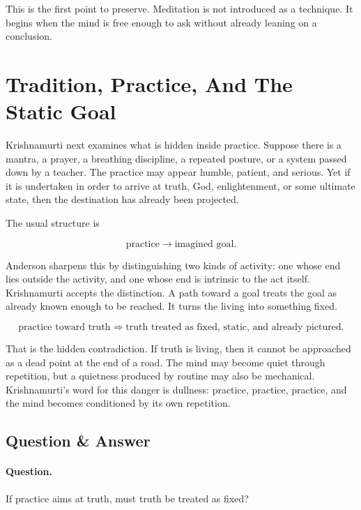 This is the first point to preserve. Meditation is not introduced as a technique. It begins when the mind is free enough to ask without already leaning on a conclusion.

\section{Tradition, Practice, And The Static Goal}

Krishnamurti next examines what is hidden inside practice. Suppose there is a mantra, a prayer, a breathing discipline, a repeated posture, or a system passed down by a teacher. The practice may appear humble, patient, and serious. Yet if it is undertaken in order to arrive at truth, God, enlightenment, or some ultimate state, then the destination has already been projected.

The usual structure is

\begin{equation}
\text{practice}
\longrightarrow
\text{imagined goal}.
\end{equation}

Anderson sharpens this by distinguishing two kinds of activity: one whose end lies outside the activity, and one whose end is intrinsic to the act itself. Krishnamurti accepts the distinction. A path toward a goal treats the goal as already known enough to be reached. It turns the living into something fixed.

\begin{equation}
\text{practice toward truth}
\Rightarrow
\text{truth treated as fixed, static, and already pictured}.
\end{equation}

That is the hidden contradiction. If truth is living, then it cannot be approached as a dead point at the end of a road. The mind may become quiet through repetition, but a quietness produced by routine may also be mechanical. Krishnamurti's word for this danger is dullness: practice, practice, practice, and the mind becomes conditioned by its own repetition.

\subsection{Question \& Answer}

\paragraph{Question.}
If practice aims at truth, must truth be treated as fixed?

